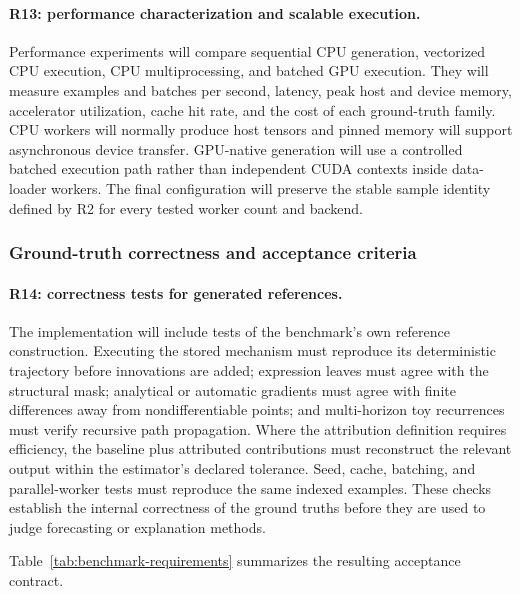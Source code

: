 \paragraph{R13: performance characterization and scalable execution.}
Performance experiments will compare sequential CPU generation,
vectorized CPU execution, CPU multiprocessing, and batched GPU execution.
They will measure examples and batches per second, latency, peak host and
device memory, accelerator utilization, cache hit rate, and the cost of each
ground-truth family. CPU workers will normally produce host tensors and pinned
memory will support asynchronous device transfer. GPU-native generation will
use a controlled batched execution path rather than independent CUDA contexts
inside data-loader workers. The final configuration will preserve the stable
sample identity defined by R2 for every tested worker count and backend.

\subsubsection{Ground-truth correctness and acceptance criteria}

\paragraph{R14: correctness tests for generated references.}
The implementation will include tests of the benchmark's own reference
construction. Executing the stored mechanism must reproduce its deterministic
trajectory before innovations are added; expression leaves must agree with the
structural mask; analytical or automatic gradients must agree with finite
differences away from nondifferentiable points; and multi-horizon toy
recurrences must verify recursive path propagation. Where the attribution
definition requires efficiency, the baseline plus attributed contributions
must reconstruct the relevant output within the estimator's declared
tolerance. Seed, cache, batching, and parallel-worker tests must reproduce the
same indexed examples. These checks establish the internal correctness of the
ground truths before they are used to judge forecasting or explanation
methods.

Table~\ref{tab:benchmark-requirements} summarizes the resulting acceptance
contract.

